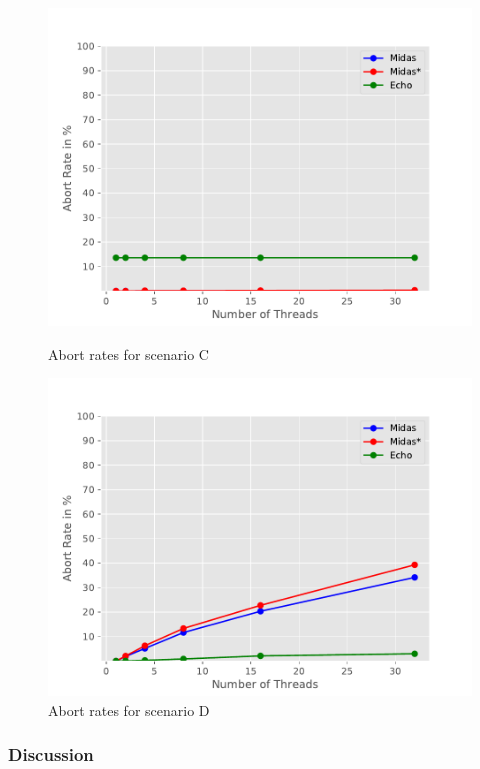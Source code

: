 \begin{figure}
\begin{minipage}[l]{0.50\textwidth}
        \includegraphics[width=\textwidth]{figures/bench/ar-ls}
        \caption{Abort rates for scenario C}
\end{minipage}
\begin{minipage}[l]{0.50\textwidth}
        \includegraphics[width=\textwidth]{figures/bench/ar-ll}
        \caption{Abort rates for scenario D}
\end{minipage}
\end{figure}

\subsubsection{Discussion}

